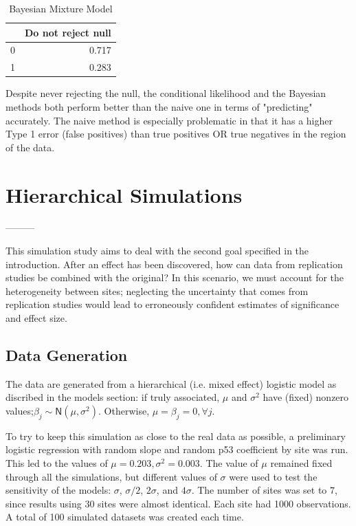 \documentclass[AMA,STIX1COL]{WileyNJD-v2}\usepackage[]{graphicx}\usepackage[]{color}
\newenvironment{knitrout}{}{} %
\begin{document}
\begin{knitrout}
\color{fgcolor}\begin{table}

\caption{\label{tab:unnamed-chunk-18}Bayesian Mixture Model}
\centering
\begin{tabular}[t]{l|r}
\hline
  & Do not reject null\\
\hline
0 & 0.717\\
\hline
1 & 0.283\\
\hline
\end{tabular}
\end{table}


\end{knitrout}

Despite never rejecting the null, the conditional likelihood and the Bayesian methods both perform better than the naive one in terms of "predicting" accurately. The naive method is especially problematic in that it has a higher Type 1 error (false positives) than true positives OR true negatives in the region of the data.

\section{Hierarchical Simulations}\label{sec:hierarchical}

---------





This simulation study aims to deal with the second goal specified in the introduction. After an effect has been discovered, how can data from replication studies be combined with the original? In this scenario, we must account for the heterogeneity between sites; neglecting the uncertainty that comes from replication studies would lead to erroneously confident estimates of significance and effect size.



\subsection{Data Generation}

The data are generated from a hierarchical (i.e. mixed effect) logistic model as discribed in the models section: if truly associated, $\mu$ and $\sigma^2$ have (fixed) nonzero values;$\beta_j \sim \textsf{N}(\mu, \sigma^2)$. Otherwise, $\mu=\beta_j = 0,  \forall j$. 

To try to keep this simulation as close to the real data as possible, a preliminary logistic regression with random slope and random p53 coefficient by site was run. This led to the values of $\mu =0.203, \sigma^2 = 0.003$. The value of $\mu$ remained fixed through all the simulations, but different values of $\sigma$ were used to test the sensitivity of the models: $\sigma$, $\sigma/2$, $2\sigma$, and  $4\sigma$. The number of sites was set to 7, since results using 30 sites were almost identical. Each site had 1000 observations. A total of 100 simulated datasets was created each time.
\end{document}
